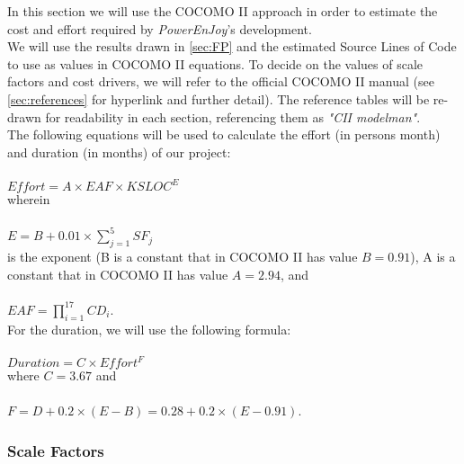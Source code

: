 In this section we will use the COCOMO II approach in order to estimate the cost and effort required by \textit{PowerEnJoy}'s development. \\

We will use the results drawn in \autoref{sec:FP} and the estimated Source Lines of Code to use as values in COCOMO II equations. To decide on the values of scale factors and cost drivers, we will refer to the official COCOMO II manual (see \autoref{sec:references} for hyperlink and further detail). The reference tables will be re-drawn for readability in each section, referencing them as \textit{"CII modelman"}.\\

The following equations will be used to calculate the effort (in persons month) and duration (in months) of our project:

		\paragraph{}\(Effort = A \times EAF \times KSLOC^E\)\\
wherein
		\paragraph{}\(E = B + 0.01 \times \sum_{j=1}^{5}SF_j\)\\
is the exponent (B is a constant that in COCOMO II has value $B=0.91$), A is a constant that in COCOMO II has value $A=2.94$, and
		\paragraph{}\(EAF = \prod_{i=1}^{17}CD_i \).\\

For the duration, we will use the following formula:
		\paragraph{}\(Duration = C \times Effort^F\)\\
where $C=3.67$ and
		\paragraph{}\(F = D + 0.2 \times (E - B) = 0.28 + 0.2 \times ( E - 0.91 )\).


\subsubsection{Scale Factors}

